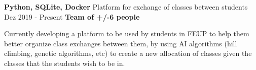 \cventry
  {\textbf{Python, SQLite, Docker}}
  {Platform for exchange of classes between students \href{https://github.com/NIAEFEUP/subject-trade}{\faExternalLink}} %
  {Dez 2019 - Present}
  {\textbf{Team of +/-6 people}}
  {
    \begin{cvitems} %
      \item {Currently developing a platform to be used by students in FEUP to help them better organize class exchanges between them, by using AI algorithms (hill climbing, genetic algorithms, etc) to create a new allocation of classes given the classes that the students wish to be in.}
    \end{cvitems}
  }